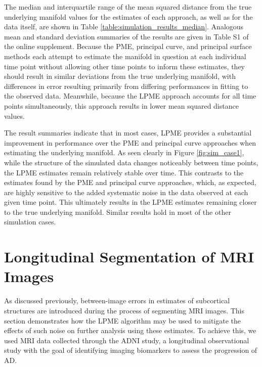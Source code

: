 \documentclass[12pt]{article}
\theoremstyle{definition}
\begin{document}
The median and interquartile range of the mean squared distance from the true underlying manifold values for the estimates of each approach, as well as for the data itself, are shown in Table \ref{table:simulation_results_median}. Analogous mean and standard deviation summaries of the results are given in Table S1 of the online supplement. Because the PME, principal curve, and principal surface methods each attempt to estimate the manifold in question at each individual time point without allowing other time points to inform these estimates, they should result in similar deviations from the true underlying manifold, with differences in error resulting primarily from differing performances in fitting to the observed data. Meanwhile, because the LPME approach accounts for all time points simultaneously, this approach results in lower mean squared distance values.

The result summaries indicate that in most cases, LPME provides a substantial improvement in performance over the PME and principal curve approaches when estimating the underlying manifold. As seen clearly in Figure \ref{fig:sim_case1}, while the structure of the simulated data changes noticeably between time points, the LPME estimates remain relatively stable over time. This contrasts to the estimates found by the PME and principal curve approaches, which, as expected, are highly sensitive to the added systematic noise in the data observed at each given time point. This ultimately results in the LPME estimates remaining closer to the true underlying manifold. Similar results hold in most of the other simulation cases.



\section{Longitudinal Segmentation of MRI Images}\label{s:application}

As discussed previously,   between-image errors in estimates of subcortical structures are introduced during the process of segmenting MRI images. This section demonstrates how the LPME algorithm may be used to mitigate the effects of such noise on further analysis using these estimates. To achieve this, we used MRI data collected through the ADNI study, a longitudinal observational study with the goal of identifying imaging biomarkers to assess the progression of AD.
\end{document}
